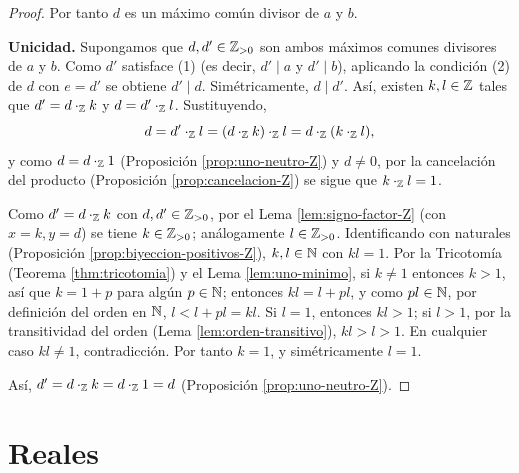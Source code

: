 \documentclass[12pt,a4paper]{book}
\begin{document}
\begin{proof}
        Por tanto $d$ es un máximo común divisor de $a$ y $b$.

        \textbf{Unicidad.} Supongamos que $d,d'\in\mathbb{Z}_{>0}$ son ambos máximos comunes divisores de $a$ y $b$. Como $d'$ satisface (1) (es decir, $d'\mid a$ y $d'\mid b$), aplicando la condición (2) de $d$ con $e=d'$ se obtiene $d'\mid d$. Simétricamente, $d\mid d'$. Así, existen $k,l\in\mathbb{Z}$ tales que $d'=d\cdot_{\mathbb{Z}}k$ y $d=d'\cdot_{\mathbb{Z}}l$. Sustituyendo,
        \begin{equation*}
            d = d'\cdot_{\mathbb{Z}}l = (d\cdot_{\mathbb{Z}}k)\cdot_{\mathbb{Z}}l = d\cdot_{\mathbb{Z}}(k\cdot_{\mathbb{Z}}l),
        \end{equation*}
        y como $d=d\cdot_{\mathbb{Z}}1$ (Proposición \ref{prop:uno-neutro-Z}) y $d\neq0$, por la cancelación del producto (Proposición \ref{prop:cancelacion-Z}) se sigue que $k\cdot_{\mathbb{Z}}l=1$.

        Como $d'=d\cdot_{\mathbb{Z}}k$ con $d,d'\in\mathbb{Z}_{>0}$, por el Lema \ref{lem:signo-factor-Z} (con $x=k,y=d$) se tiene $k\in\mathbb{Z}_{>0}$; análogamente $l\in\mathbb{Z}_{>0}$. Identificando con naturales (Proposición \ref{prop:biyeccion-positivos-Z}), $k,l\in\mathbb{N}$ con $kl=1$. Por la Tricotomía (Teorema \ref{thm:tricotomia}) y el Lema \ref{lem:uno-minimo}, si $k\neq1$ entonces $k>1$, así que $k=1+p$ para algún $p\in\mathbb{N}$; entonces $kl=l+pl$, y como $pl\in\mathbb{N}$, por definición del orden en $\mathbb{N}$, $l<l+pl=kl$. Si $l=1$, entonces $kl>1$; si $l>1$, por la transitividad del orden (Lema \ref{lem:orden-transitivo}), $kl>l>1$. En cualquier caso $kl\neq1$, contradicción. Por tanto $k=1$, y simétricamente $l=1$.

        Así, $d'=d\cdot_{\mathbb{Z}}k=d\cdot_{\mathbb{Z}}1=d$ (Proposición \ref{prop:uno-neutro-Z}).
    \end{proof}

    \section{Reales}
\end{document}

